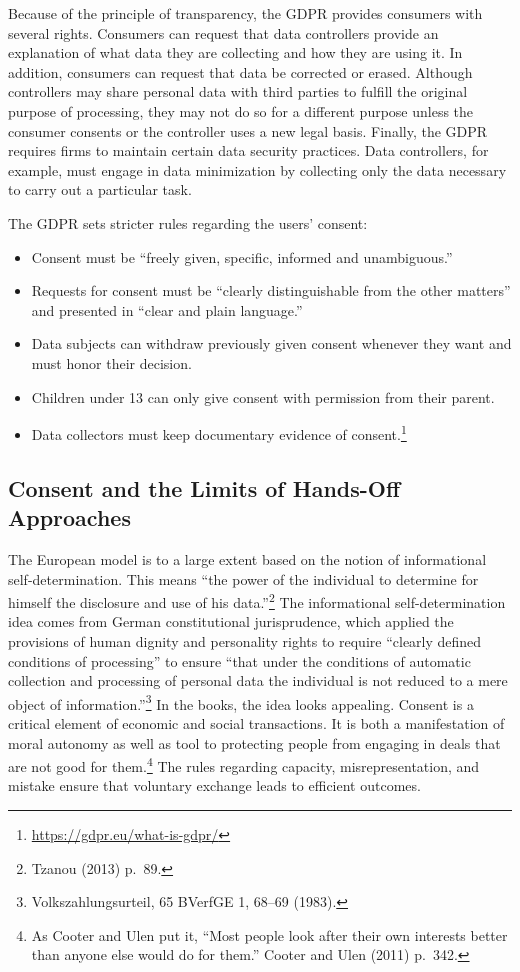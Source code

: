 \documentclass[
  11pt,
  letterpaper,
]{article}
\begin{document}
Because of the principle of transparency, the GDPR provides consumers with several rights. Consumers can request that data controllers provide an explanation of what data they are collecting and how they are using it. In addition, consumers can request that data be corrected or erased. Although controllers may share personal data with third parties to fulfill the original purpose of processing, they may not do so for a different purpose unless the consumer consents or the controller uses a new legal basis. Finally, the GDPR requires firms to maintain certain data security practices. Data controllers, for example, must engage in data minimization by collecting only the data necessary to carry out a particular task.

The GDPR sets stricter rules regarding the users' consent:

\begin{itemize}
\item
  Consent must be ``freely given, specific, informed and unambiguous.''
\item
  Requests for consent must be ``clearly distinguishable from the other matters'' and presented in ``clear and plain language.''
\item
  Data subjects can withdraw previously given consent whenever they want and must honor their decision.
\item
  Children under 13 can only give consent with permission from their parent.
\item
  Data collectors must keep documentary evidence of consent.\footnote{\url{https://gdpr.eu/what-is-gdpr/}}
\end{itemize}

\hypertarget{consent-and-the-limits-of-hands-off-approaches}{%
\subsection{Consent and the Limits of Hands-Off Approaches}\label{consent-and-the-limits-of-hands-off-approaches}}

The European model is to a large extent based on the notion of informational self-determination. This means ``the power of the individual to determine for himself the disclosure and use of his data.''\footnote{Tzanou (2013) p.~89.} The informational self-determination idea comes from German constitutional jurisprudence, which applied the provisions of human dignity and personality rights to require ``clearly defined conditions of processing'' to ensure ``that under the conditions of automatic collection and processing of personal data the individual is not reduced to a mere object of information.''\footnote{Volkszahlungsurteil, 65 BVerfGE 1, 68--69 (1983).} In the books, the idea looks appealing. Consent is a critical element of economic and social transactions. It is both a manifestation of moral autonomy as well as tool to protecting people from engaging in deals that are not good for them.\footnote{As Cooter and Ulen put it, ``Most people look after their own interests better than anyone else would do for them.'' Cooter and Ulen (2011) p.~342.} The rules regarding capacity, misrepresentation, and mistake ensure that voluntary exchange leads to efficient outcomes.
\end{document}
